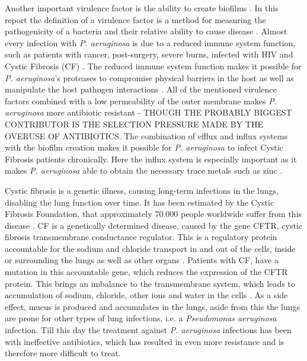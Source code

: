 Another important virulence factor is the ability to create biofilms \cite{Al-Bakri2019Photothermal-inducedBiofilm}. In this report the definition of a virulence factor is a method for measuring the pathogenicity of a bacteria and their relative ability to cause disease \cite{Madigan2022BrockMicroorganisms}. Almost every infection with \textit{P. aeruginosa} is due to a reduced immune system function, such as patients with cancer, post-surgery, severe burns, infected with HIV and Cystic Fibrosis (CF) \cite{Thi2020PseudomonasBiofilms}. The reduced immune system function makes it possible for \textit{P. aeruginosa}'s proteases to compromise physical barriers in the host as well as manipulate the host pathogen interactions \cite{Lyczak2000EstablishmentOpportunist} \cite{Pachori2019EmergenceReview}. All of the mentioned virulence factors combined with a low permeability of the outer membrane makes \textit{P. aeruginosa} more antibiotic resistant - THOUGH THE PROBABLY BIGGEST CONTRIBUTOR IS THE SELECTION PRESSURE MADE BY THE OVERUSE OF ANTIBIOTICS. 
The combination of efflux and influx systems with the biofilm creation makes it possible for \textit{P. aeruginosa} to infect Cystic Fibrosis patients chronically. Here the influx system is especially important as it makes \textit{P. aeruginosa} able to obtain the necessary trace metals such as zinc \cite{Mastropasqua2018EfficientLung}.

Cystic fibrosis is a genetic illness, causing long-term infections in the lungs, disabling the lung function over time. It has been estimated by the Cystic Fibrosis Foundation, that approximately 70.000 people worldwide suffer from this disease \cite{CysticFibrosisFoundationBasicsProtein} \cite{cysticfibrosisnewstoday.com2016CysticStatistics}. CF is a genetically determined disease, caused by the gene CFTR, cystic fibrosis transmembrane conductance regulator. This is a regulatory protein accountable for the sodium and chloride transport in and out of the cells, inside or surrounding the lungs as well as other organs \cite{Booth2019CysticFibrosis}. Patients with CF, have a mutation in this accountable gene, which reduces the expression of the CFTR protein. This brings an imbalance to the transmembrane system, which leads to accumulation of sodium, chloride, other ions and water in the cells \cite{CysticFibrosisFoundationBasicsProtein}. As a side effect, mucus is produced and accumulates in the lungs, aside from this the lungs are prone for other types of lung infections, i.e. a \textit{Pseudomonas aeruginosa} infection. 
Till this day the treatment against \textit{P. aeruginosa} infections has been with ineffective antibiotics, which has resulted in even more resistance and is therefore more difficult to treat. 

